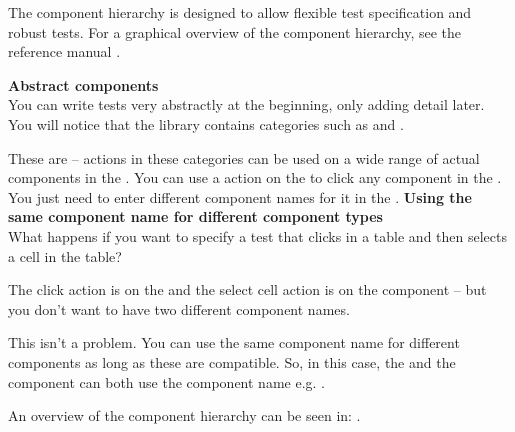 The component hierarchy  is designed to allow flexible test specification and robust tests. For a graphical overview of the component hierarchy, see the reference manual . 
\bigskip

\textbf{Abstract components}\\

You can write tests very abstractly at the beginning, only adding detail later. You will notice that the library contains categories such as  and . 

These are  -- actions in these categories can be used on a wide range of actual components in the \gdaut{}. You can use a  action on the  to click any component in the \gdaut{}. You just need to enter different component names for it in the \gdcompnamesview{}. 
\bigskip
\textbf{Using the same component name for different component types}\\

What happens if you want to specify a test that clicks in a table and then selects a cell in the table?

The click action is on the  and the select cell action is on the  component -- but you don't want to have two different component names. 

This isn't a problem. You can use the same component name for different components as long as these are compatible. So, in this case, the  and the   component can both use the component name e.g. . 


An overview of the component hierarchy can be seen in: .
